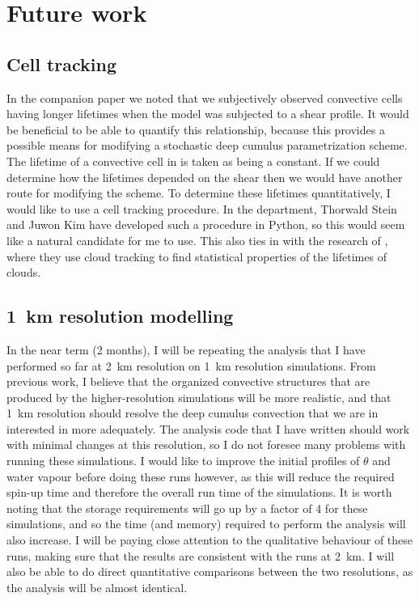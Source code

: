 \documentclass[11pt,a4paper]{article}
\begin{document}

\section{Future work}

\subsection{Cell tracking}
\label{sec:cell_tracking}

In the companion paper we noted that we subjectively observed convective cells having longer lifetimes when the model was subjected to a shear profile. It would be beneficial to be able to quantify this relationship, because this provides a possible means for modifying a stochastic deep cumulus parametrization scheme. The lifetime of a convective cell in \cite{plant2008stochastic} is taken as being a constant. If we could determine how the lifetimes depended on the shear then we would have another route for modifying the scheme. To determine these lifetimes quantitatively, I would like to use a cell tracking procedure. In the department, Thorwald Stein and Juwon Kim have developed such a procedure in Python, so this would seem like a natural candidate for me to use. This also ties in with the research of \cite{plant2009statistical}, where they use cloud tracking to find statistical properties of the lifetimes of clouds. 

\subsection{\SI{1}{km} resolution modelling}
\label{sec:1km_res}

In the near term (2 months), I will be repeating the analysis that I have performed so far at \SI{2}{km} resolution on \SI{1}{km} resolution simulations. From previous work, I believe that the organized convective structures that are produced by the higher-resolution simulations will be more realistic, and that \SI{1}{km} resolution should resolve the deep cumulus convection that we are in interested in more adequately. The analysis code that I have written should work with minimal changes at this resolution, so I do not foresee many problems with running these simulations. I would like to improve the initial profiles of $\theta$ and water vapour before doing these runs however, as this will reduce the required spin-up time and therefore the overall run time of the simulations. It is worth noting that the storage requirements will go up by a factor of 4 for these simulations, and so the time (and memory) required to perform the analysis will also increase. I will be paying close attention to the qualitative behaviour of these runs, making sure that the results are consistent with the runs at \SI{2}{km}. I will also be able to do direct quantitative comparisons between the two resolutions, as the analysis will be almost identical.
\end{document}
